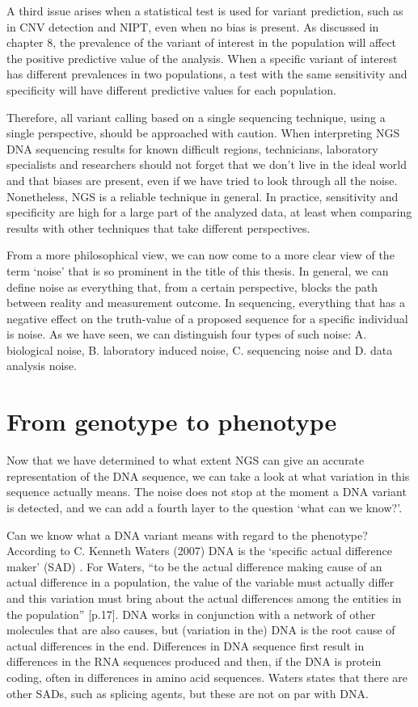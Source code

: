 A third issue arises when a statistical test is used for variant prediction, such as in CNV detection and NIPT, even when no bias is present. 
As discussed in chapter 8, the prevalence of the variant of interest in the population will affect the positive predictive value of the analysis. 
When a specific variant of interest has different prevalences in two populations, a test with the same sensitivity and specificity will have different predictive values for each population.

Therefore, all variant calling based on a single sequencing technique, using a single perspective, should be approached with caution. 
When interpreting NGS DNA sequencing results for known difficult regions, technicians, laboratory specialists and researchers should not forget that we don’t live in the ideal world and that biases are present, even if we have tried to look through all the noise. 
Nonetheless, NGS is a reliable technique in general. 
In practice, sensitivity and specificity are high for a large part of the analyzed data, at least when comparing results with other techniques that take different perspectives.

From a more philosophical view, we can now come to a more clear view of the term ‘noise’ that is so prominent in the title of this thesis. 
In general, we can define noise as everything that, from a certain perspective, blocks the path between reality and measurement outcome. 
In sequencing, everything that has a negative effect on the truth-value of a proposed sequence for a specific individual is noise. 
As we have seen, we can distinguish four types of such noise: A. biological noise, B. laboratory induced noise, C. sequencing noise and D. data analysis noise. 

\section{From genotype to phenotype} \label{From genotype to phenotype}
Now that we have determined to what extent NGS can give an accurate representation of the DNA sequence, we can take a look at what variation in this sequence actually means. 
The noise does not stop at the moment a DNA variant is detected, and we can add a fourth layer to the question ‘what can we know?’.

Can we know what a DNA variant means with regard to the phenotype? 
According to C. Kenneth Waters (2007) DNA is the ‘specific actual difference maker’ (SAD) \cite{Waters_2007}. 
For Waters, “to be the actual difference making cause of an actual difference in a population, the value of the variable must actually differ and this variation must bring about the actual differences among the entities in the population” \cite{Waters_2007}[p.17]. 
DNA works in conjunction with a network of other molecules that are also causes, but (variation in the) DNA is the root cause of actual differences in the end.
Differences in DNA sequence first result in differences in the RNA sequences produced and then, if the DNA is protein coding, often in differences in amino acid sequences. 
Waters states that there are other SADs, such as splicing agents, but these are not on par with DNA. 


